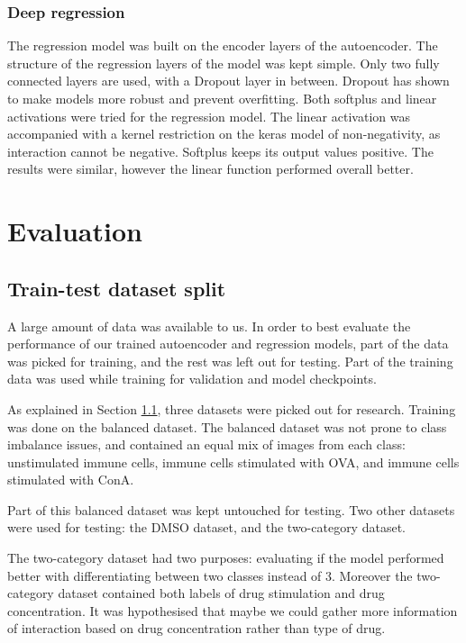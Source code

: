 \documentclass{l4proj}
\begin{document}
\subsection{Deep regression}

The regression model was built on the encoder layers of the autoencoder. The structure of the regression layers of the model was kept simple. Only two fully connected layers are used, with a Dropout layer in between. Dropout has shown to make models more robust and prevent overfitting.
Both softplus and linear activations were tried for the regression model. The linear activation was accompanied with a kernel restriction on the keras model of non-negativity, as interaction cannot be negative. Softplus keeps its output values positive. The results were similar, however the linear function performed overall better.

\chapter{Evaluation}

\section{Train-test dataset split}

A large amount of data was available to us. In order to best evaluate the performance of our trained autoencoder and regression models, part of the data was picked for training, and the rest was left out for testing. Part of the training data was used while training for validation and model checkpoints.

As explained in Section \ref{}, three datasets were picked out for research. Training was done on the balanced dataset. The balanced dataset was not prone to class imbalance issues, and contained an equal mix of images from each class: unstimulated immune cells, immune cells stimulated with OVA, and immune cells stimulated with ConA.

Part of this balanced dataset was kept untouched for testing. Two other datasets were used for testing: the DMSO dataset, and the two-category dataset.

The two-category dataset had two purposes: evaluating if the model performed better with differentiating between two classes instead of 3. Moreover the two-category dataset contained both labels of drug stimulation and drug concentration. It was hypothesised that maybe we could gather more information of interaction based on drug concentration rather than type of drug.
\end{document}
